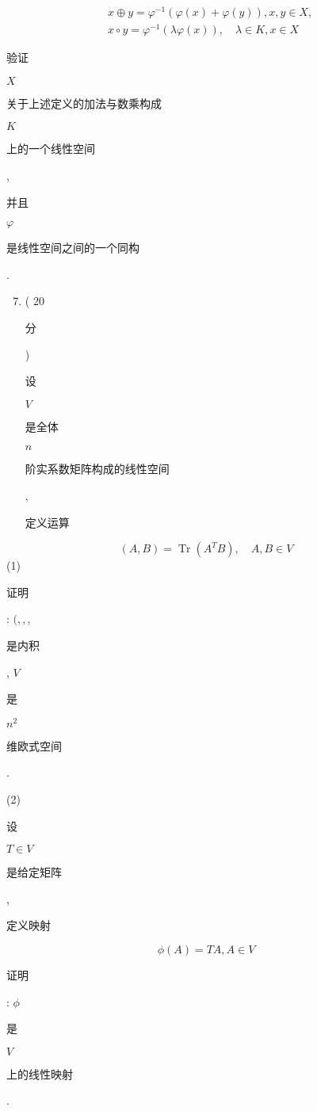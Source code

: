 \documentclass[10pt]{article}
\begin{document}
$$
\begin{aligned}
&x \oplus y=\varphi^{-1}(\varphi(x)+\varphi(y)), x, y \in X, \\
&x \circ y=\varphi^{-1}(\lambda \varphi(x)), \quad \lambda \in K, x \in X
\end{aligned}
$$
\begin{CJK}{UTF8}{mj}验证\end{CJK} $X$ \begin{CJK}{UTF8}{mj}关于上述定义的加法与数乘构成\end{CJK} $K$ \begin{CJK}{UTF8}{mj}上的一个线性空间\end{CJK}, \begin{CJK}{UTF8}{mj}并且\end{CJK} $\varphi$ \begin{CJK}{UTF8}{mj}是线性空间之间的一个同构\end{CJK}.

\begin{enumerate}
  \setcounter{enumi}{6}
  \item ( 20 \begin{CJK}{UTF8}{mj}分\end{CJK}) \begin{CJK}{UTF8}{mj}设\end{CJK} $V$ \begin{CJK}{UTF8}{mj}是全体\end{CJK} $n$ \begin{CJK}{UTF8}{mj}阶实系数矩阵构成的线性空间\end{CJK}, \begin{CJK}{UTF8}{mj}定义运算\end{CJK}
\end{enumerate}
$$
(A, B)=\operatorname{Tr}\left(A^{T} B\right), \quad A, B \in V
$$
(1) \begin{CJK}{UTF8}{mj}证明\end{CJK}: $(,,$, \begin{CJK}{UTF8}{mj}是内积\end{CJK}, $V$ \begin{CJK}{UTF8}{mj}是\end{CJK} $n^{2}$ \begin{CJK}{UTF8}{mj}维欧式空间\end{CJK}.

(2) \begin{CJK}{UTF8}{mj}设\end{CJK} $T \in V$ \begin{CJK}{UTF8}{mj}是给定矩阵\end{CJK}, \begin{CJK}{UTF8}{mj}定义映射\end{CJK}
$$
\phi(A)=T A, A \in V
$$
\begin{CJK}{UTF8}{mj}证明\end{CJK}: $\phi$ \begin{CJK}{UTF8}{mj}是\end{CJK} $V$ \begin{CJK}{UTF8}{mj}上的线性映射\end{CJK}.
\end{document}
